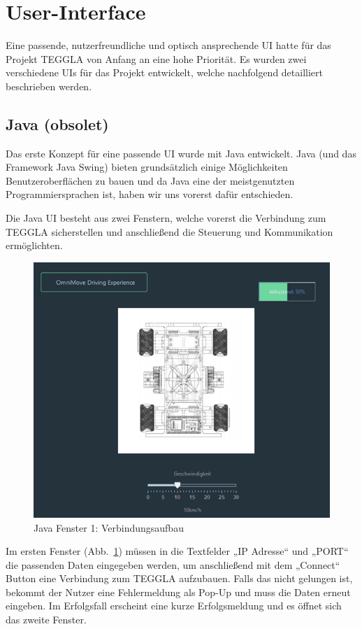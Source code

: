 \section{User-Interface}
Eine passende, nutzerfreundliche und optisch ansprechende UI hatte für das Projekt TEGGLA von Anfang an eine hohe Priorität. Es wurden zwei verschiedene UIs für das Projekt entwickelt, welche nachfolgend detailliert beschrieben werden. 

\subsection{Java (obsolet)}
Das erste Konzept für eine passende UI wurde mit Java entwickelt. 
Java (und das Framework Java Swing) bieten grundsätzlich einige Möglichkeiten Benutzeroberflächen zu bauen und da Java eine der meistgenutzten Programmiersprachen ist, haben wir uns vorerst dafür entschieden.

Die Java UI besteht aus zwei Fenstern, welche vorerst die Verbindung zum TEGGLA sicherstellen und anschließend die Steuerung und Kommunikation ermöglichten.

\begin{figure}[!ht]
	\centering
	\includegraphics[width=\textwidth]{bilder/java1.png}
	\caption{Java Fenster 1: Verbindungsaufbau}
	\label{bild:java1}
\end{figure}


Im ersten Fenster (Abb.~\ref{bild:java1}) müssen in die Textfelder „IP Adresse“ und „PORT“ die passenden Daten eingegeben werden, um anschließend mit dem „Connect“ Button eine Verbindung zum TEGGLA aufzubauen. 
Falls das nicht gelungen ist, bekommt der Nutzer eine Fehlermeldung als Pop-Up und muss die Daten erneut eingeben. 
Im Erfolgsfall erscheint eine kurze Erfolgsmeldung und es öffnet sich das zweite Fenster.

